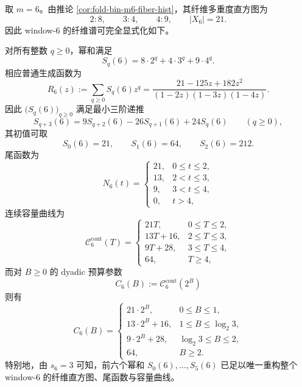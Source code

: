 \begin{proposition}\label{prop:xi-window6-complete-finite-scale-spectrum-closed-form}
取 \(m=6\)。由推论 \ref{cor:fold-bin-m6-fiber-hist}，其纤维多重度直方图为
\[
2:8,\qquad 3:4,\qquad 4:9,
\qquad |X_6|=21.
\]
因此 window-\(6\) 的纤维谱可完全显式化如下。
\par
对所有整数 \(q\ge 0\)，幂和满足
\[
\boxed{\;
S_q(6)=8\cdot 2^q+4\cdot 3^q+9\cdot 4^q.\;}
\]
相应普通生成函数为
\[
\boxed{\;
R_6(z):=\sum_{q\ge 0}S_q(6)z^q
=
\frac{21-125z+182z^2}{(1-2z)(1-3z)(1-4z)}.\;}
\]
因此 \(\bigl(S_q(6)\bigr)_{q\ge 0}\) 满足最小三阶递推
\[
\boxed{\;
S_{q+3}(6)=9S_{q+2}(6)-26S_{q+1}(6)+24S_q(6)
\qquad(q\ge 0),\;}
\]
其初值可取
\[
S_0(6)=21,\qquad S_1(6)=64,\qquad S_2(6)=212.
\]
尾函数为
\[
\boxed{\;
N_6(t)=
\begin{cases}
21,& 0\le t\le 2,\\
13,& 2<t\le 3,\\
9,& 3<t\le 4,\\
0,& t>4,
\end{cases}\;}
\]
连续容量曲线为
\[
\boxed{\;
\mathcal C_6^{\mathrm{cont}}(T)=
\begin{cases}
21T,& 0\le T\le 2,\\
13T+16,& 2\le T\le 3,\\
9T+28,& 3\le T\le 4,\\
64,& T\ge 4,
\end{cases}\;}
\]
而对 \(B\ge 0\) 的 dyadic 预算参数
\[
C_6(B):=\mathcal C_6^{\mathrm{cont}}(2^B)
\]
则有
\[
\boxed{\;
C_6(B)=
\begin{cases}
21\cdot 2^B,& 0\le B\le 1,\\
13\cdot 2^B+16,& 1\le B\le \log_2 3,\\
9\cdot 2^B+28,& \log_2 3\le B\le 2,\\
64,& B\ge 2.
\end{cases}\;}
\]
特别地，由 \(s_6=3\) 可知，前六个幂和 \(S_0(6),\dots,S_5(6)\) 已足以唯一重构整个 window-\(6\) 的纤维直方图、尾函数与容量曲线。
\end{proposition}
